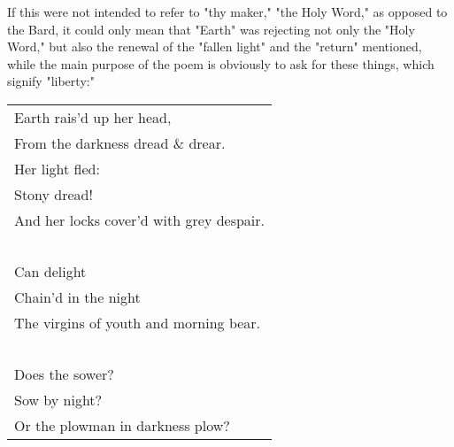 \hspace*{5mm}If this were not intended to refer to "thy maker," "the Holy Word," as opposed to the Bard, it could
only mean that "Earth" was rejecting not only the "Holy Word," but also the renewal of the "fallen light"
and the "return" mentioned, while the main purpose of the poem is obviously to ask for these things, which 
signify "liberty:"\par
\begin{center}
	\begin{tabular}{l}
		Earth rais'd up her head,                \\
		From the darkness dread \& drear.        \\
		Her light fled:                          \\
		Stony dread!                             \\
		And her locks cover'd with grey despair. \\
		~                                        \\
		Can delight                              \\
		Chain'd in the night                     \\
		The virgins of youth and morning bear.   \\
		~                                        \\
		Does the sower?                          \\
		Sow by night?                            \\
		Or the plowman in darkness plow?
	\end{tabular}
\end{center}

\newpage

